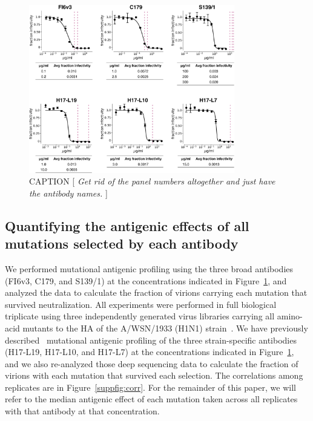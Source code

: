\documentclass[11pt]{article}
\newcommand{\comment}[1]{{\color{red}[\textsl{#1}]}}
\begin{document}
\begin{figure}
\centerline{\includegraphics[width=0.8\textwidth]{figs/neutralization_curves/WT_neutralization_curves.pdf}}
\caption{\label{fig:neutcurves}
CAPTION
\comment{
Get rid of the panel numbers altogether and just have the antibody names.
}
}
\end{figure}

\subsection*{Quantifying the antigenic effects of all mutations selected by each antibody}
We performed mutational antigenic profiling using the three broad antibodies (FI6v3, C179, and S139/1) at the concentrations indicated in Figure~\ref{fig:neutcurves}, and analyzed the data to calculate the fraction of virions carrying each mutation that survived neutralization. 
All experiments were performed in full biological triplicate using three independently generated virus libraries carrying all amino-acid mutants to the HA of the A/WSN/1933 (H1N1) strain~\citep{doud2016accurate}.
We have previously described~\citep{doud2017complete} mutational antigenic profiling of the three strain-specific antibodies (H17-L19, H17-L10, and H17-L7) at the concentrations indicated in Figure~\ref{fig:neutcurves}, and we also re-analyzed those deep sequencing data to calculate the fraction of virions with each mutation that survived each selection.
The correlations among replicates are in Figure~\ref{suppfig:corr}.
For the remainder of this paper, we will refer to the median antigenic effect of each mutation taken across all replicates with that antibody at that concentration.
\end{document}
